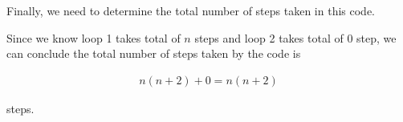 \documentclass[12pt]{article}
\begin{document}
\begin{enumerate}[a.]
    \bigskip

    Finally, we need to determine the total number of steps taken in this code.

    \bigskip

    Since we know loop 1 takes total of $n$ steps and loop 2 takes total of 0 step, we can
    conclude the total number of steps taken by the code is

    \begin{align}
        n(n+2) + 0 = n(n+2)
    \end{align}

    steps.














\end{enumerate}
\end{document}
